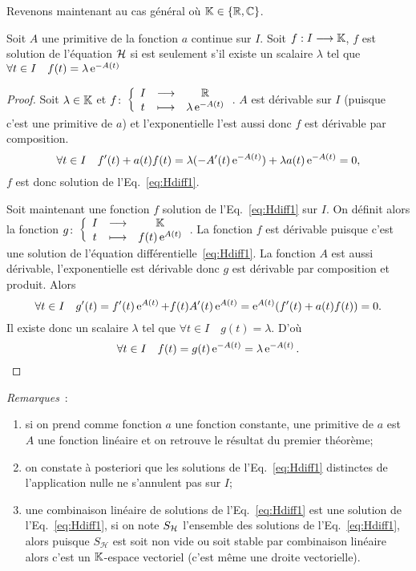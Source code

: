 Revenons maintenant au cas général où $\mathbb{K} \in \{\mathbb{R}, \mathbb{C}\}$.
%
\begin{theo}\label{theo:2}
Soit $A$ une primitive de la fonction $a$ continue sur $I$. Soit $f:I \longrightarrow \mathbb{K}$, $f$ est solution de l'équation $\mathcal{H}$ si est seulement s'il existe un scalaire $\lambda$ tel que $\forall t \in I \quad f(t)=\lambda \operatorname{e}^{-A(t)}$
\end{theo}
\begin{proof}
Soit $\lambda \in \mathbb{K}$ et $f\colon \left\{\begin{array}{ccc} I & \longrightarrow &\mathbb{R}\\ t & \longmapsto & \lambda \operatorname{e}^{-A(t)} \end{array} \right.$. $A$ est dérivable sur $I$ (puisque c'est une primitive de $a$) et l'exponentielle l'est aussi donc $f$ est dérivable par composition.
\begin{equation}
\forall t \in I \quad f'(t)+a(t)f(t)=\lambda(-A'(t)\operatorname{e}^{-A(t)}) + \lambda a(t)\operatorname{e}^{-A(t)}=0,
\end{equation}
$f$ est donc solution de l'Eq.~\eqref{eq:Hdiff1}.

Soit maintenant une fonction $f$ solution de l'Eq.~\eqref{eq:Hdiff1} sur $I$. On définit alors la fonction $g\colon \left\{\begin{array}{ccc} I & \longrightarrow &\mathbb{K}\\ t & \longmapsto & f(t)\operatorname{e}^{A(t)} \end{array} \right.$. La fonction $f$ est dérivable puisque c'est une solution de l'équation différentielle~\eqref{eq:Hdiff1}. La fonction  $A$ est aussi dérivable, l'exponentielle est dérivable donc $g$ est dérivable par composition et produit. Alors
\begin{equation}
\forall t \in I \quad g'(t)=f'(t) \operatorname{e}^{A(t)} + f(t)A'(t)\operatorname{e}^{A(t)}=\operatorname{e}^{A(t)}(f'(t) + a(t)f(t)) =0.
\end{equation}
Il existe donc un scalaire $\lambda$ tel que $\forall t \in I \quad g(t)=\lambda$. D'où 
\begin{equation} 
\forall t \in I \quad f(t)=g(t) \operatorname{e}^{-A(t)}=\lambda \operatorname{e}^{-A(t)}.
\end{equation}
\end{proof}

\emph{Remarques}~:
\begin{enumerate}
\item si on prend comme fonction $a$ une fonction constante, une primitive de $a$ est $A$ une fonction linéaire et on retrouve le résultat du premier théorème;
\item on constate à posteriori que les solutions de l'Eq.~\eqref{eq:Hdiff1} distinctes de l'application nulle ne s'annulent pas sur $I$;
\item une combinaison linéaire de solutions de l'Eq.~\eqref{eq:Hdiff1} est une solution de l'Eq.~\eqref{eq:Hdiff1}, si on note $S_{\mathcal{H}} $ l'ensemble des solutions de l'Eq.~\eqref{eq:Hdiff1}, alors puisque $S_\mathcal{H} $ est soit non vide ou soit stable par combinaison linéaire alors c'est un $\mathbb{K}$-espace vectoriel (c'est même une droite vectorielle).
\end{enumerate}

